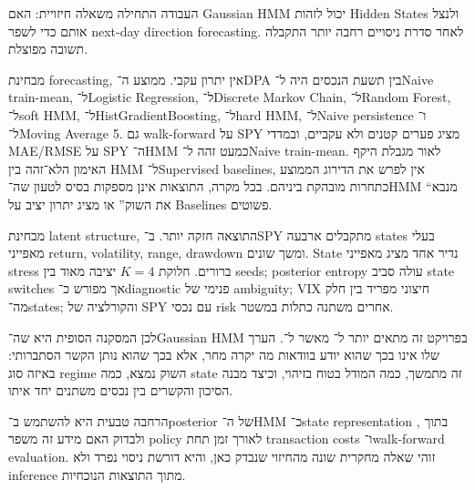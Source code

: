 העבודה התחילה משאלה חיזויית: האם Gaussian HMM יכול לזהות Hidden States ולנצל אותם כדי לשפר next-day direction forecasting. לאחר סדרת ניסויים רחבה יותר התקבלה תשובה מפוצלת.

מבחינת forecasting, אין יתרון עקבי. ממוצע ה־DPA בין תשעת הנכסים היה  ל־Naive train-mean,  ל־Logistic Regression,  ל־Discrete Markov Chain,  ל־Random Forest,  ל־soft HMM,  ל־HistGradientBoosting,  ל־hard HMM,  ל־Naive persistence ו־ ל־Moving Average 5. גם walk-forward על SPY מציג פערים קטנים ולא עקביים, ובמדדי MAE/RMSE על SPY ה־HMM כמעט זהה ל־Naive train-mean. לאור מגבלת היקף האימון הלא־זהה בין HMM ל־Supervised baselines, אין לפרש את הדירוג הממוצע כתחרות מובהקת ביניהם. בכל מקרה, התוצאות אינן מספקות בסיס לטעון שה־HMM ``מנבא את השוק'' או מציג יתרון יציב על Baselines פשוטים.

מבחינת latent structure, התוצאה חזקה יותר. ב־SPY מתקבלים ארבעה states בעלי מאפייני return, volatility, range, drawdown ומשך שונים. State נדיר אחד מציג מאפייני stress ברורים. חלוקת \(K=4\) יציבה מאוד בין seeds; posterior entropy עולה סביב state switches אך מפורש כ־diagnostic פנימי של ambiguity; VIX חיצוני מפריד בין חלק מה־states; והקורלציה של SPY עם נכסי risk אחרים משתנה כתלות במשטר.

לכן המסקנה הסופית היא שה־Gaussian HMM בפרויקט זה מתאים יותר ל־\textbf{} מאשר ל־\textbf{}. הערך שלו אינו בכך שהוא יודע בוודאות מה יקרה מחר, אלא בכך שהוא נותן הקשר הסתברותי: באיזה סוג regime השוק נמצא, כמה state זה מתמשך, כמה המודל בטוח בזיהוי, וכיצד מבנה הסיכון והקשרים בין נכסים משתנים יחד איתו.

הרחבה טבעית היא להשתמש ב־posterior של ה־HMM כ־state representation בתוך , ולבדוק האם מידע זה משפר policy לאורך זמן תחת transaction costs ו־walk-forward evaluation. זוהי שאלה מחקרית שונה מהחיזוי שנבדק כאן, והיא דורשת ניסוי נפרד ולא inference מתוך התוצאות הנוכחיות.
